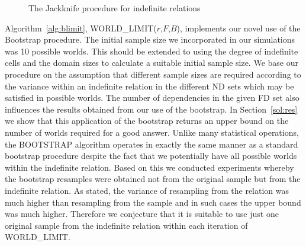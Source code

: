 {\line
\begin{figure}[ht]
\begin{center}
\caption{\label{cp:fig:jackknife} The Jackknife procedure for
indefinite relations}
\end{center}
\end{figure}
}


\medskip
{}

Algorithm~\ref{alg:blimit}, WORLD\_LIMIT($r$,$F$,$B$), implements our
novel use of the Bootstrap procedure. The initial sample size we
incorporated in our simulations was 10 possible worlds. This should be
extended to using the degree of indefinite cells and the domain sizes
to calculate a suitable initial sample size.
We
base our procedure on the assumption that different sample sizes are
required according to the variance within an indefinite relation in
the different ND sets which may be satisfied in possible
worlds. The number of dependencies in the given FD set also influences
the results obtained from our use of the bootstrap. In Section~\ref{sol:res}
we show that this application of the bootstrap returns an upper bound on 
the number of worlds required for a good answer. Unlike many statistical
operations, the BOOTSTRAP
algorithm operates in exactly the same manner as a standard bootstrap
procedure despite the fact that we potentially have all possible worlds
within the indefinite relation.  Based on this we conducted experiments
whereby the bootstrap resamples were obtained not from the original
sample but from the indefinite relation. As stated, the variance of resampling
from the relation
was much higher than resampling from the sample and in such cases the
upper bound was much higher.
Therefore we conjecture that it is suitable to use just one original sample
from the indefinite relation within each iteration of WORLD\_LIMIT.

